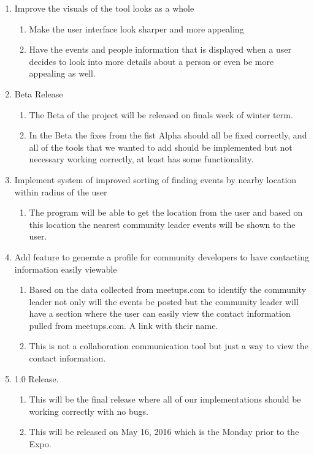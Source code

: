 \documentclass[draftclsnofoot,10pt,onecolumn]{IEEEtran} %
\begin{document}
\begin{enumerate}
\item Improve the visuals of the tool looks as a whole \\
\begin{enumerate}
\item Make the user interface look sharper and more appealing
\item Have the events and people information that is displayed when a user decides to look into more details about a person or even be more appealing as well. \\
\end{enumerate}

\item Beta Release \\
\begin{enumerate}
\item The Beta of the project will be released on finals week of winter term.
\item In the Beta the fixes from the fist Alpha should all be fixed correctly, and all of the tools that we wanted to add should be implemented but not necessary working correctly, at least has some functionality. \\
\end{enumerate}

\item Implement system of improved sorting of finding events by nearby location within radius of the user \\
\begin{enumerate}
\item The program will be able to get the location from the user and based on this location the nearest community leader events will be shown to the user. \\
\end{enumerate}

\item Add feature to generate a profile for community developers to have contacting information easily viewable \\
\begin{enumerate}
\item Based on the data collected from meetups.com to identify the community leader not only will the events be posted but the community leader will have a section where the user can easily view the contact information pulled from meetups.com. A link with their name.
\item This is not a collaboration communication tool but just a way to view the contact information. \\
\end{enumerate}

\item 1.0 Release. \\
\begin{enumerate}
\item This will be the final release where all of our implementations should be working correctly with no bugs.
\item This will be released on May 16, 2016 which is the Monday prior to the Expo. \\
\end{enumerate}
\end{enumerate}
\end{document}
